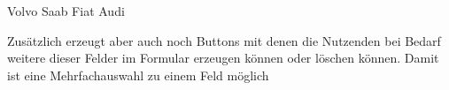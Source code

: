 \documentclass[letterpaper,10pt,ngerman]{sphinxmanual}
\begin{document}
\begin{sphinxVerbatim}[commandchars=\\\{\}]
   
     Volvo
     Saab
     Fiat
     Audi
\end{sphinxVerbatim}

Zusätzlich erzeugt  aber auch noch Buttons mit denen die Nutzenden bei Bedarf weitere dieser Felder im Formular erzeugen können oder löschen können. Damit ist eine Mehrfachauswahl zu einem Feld möglich



\renewcommand{\indexname}{Stichwortverzeichnis}
\printindex
\end{document}
